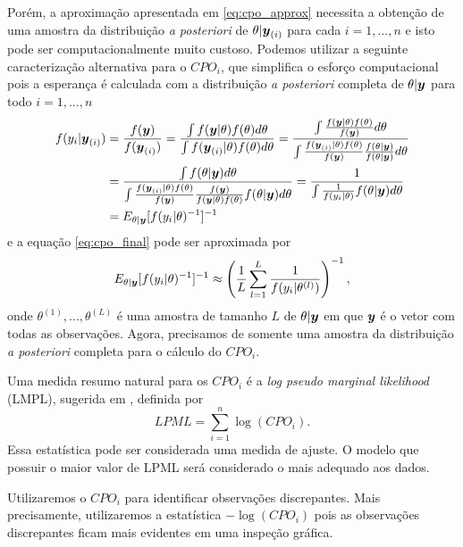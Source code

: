Porém, a aproximação apresentada em \eqref{eq:cpo_approx} necessita a obtenção de uma amostra da distribuição \textit{a posteriori} de $\theta|{\boldsymbol{y}_{(i)}}$ para cada $i=1,\ldots,n$ e isto pode ser computacionalmente muito custoso. Podemos utilizar a seguinte caracterização alternativa para o $CPO_i$, que simplifica o esforço computacional pois a esperança é calculada com a distribuição \textit{a posteriori} completa de $\theta|{\boldsymbol{y}}$ para todo $i=1,\ldots,n$
\begin{equation}\label{eq:cpo_final}
\begin{split}
f(y_i|{\boldsymbol{y}_{(i)}}) & = \frac{f({\boldsymbol{y}})}{f({\boldsymbol{y}_{(i)}})} = \frac{\int f({\boldsymbol{y}}|\theta) f(\theta) d\theta}{\int f({\boldsymbol{y}_{(i)}}|\theta) f(\theta) d\theta} = \frac{\int \frac{f({\boldsymbol{y}}|\theta) f(\theta)}{f({\boldsymbol{y}})} d\theta}{\int \frac{f({\boldsymbol{y}_{(i)}}|\theta) f(\theta)}{f({\boldsymbol{y}})} \frac{f(\theta|{\boldsymbol{y}})}{f(\theta|{\boldsymbol{y}})} d\theta} \\
{}& = \frac{\int f(\theta|{\boldsymbol{y}}) d\theta}{\int \frac{f({\boldsymbol{y}_{(i)}}|\theta) f(\theta)}{f({\boldsymbol{y}})} \frac{f({\boldsymbol{y}})}{f({\boldsymbol{y}}|\theta)f(\theta)} f(\theta|{\boldsymbol{y}}) d\theta} = \frac{1}{\int \frac{1}{f(y_i|\theta)} f(\theta|{\boldsymbol{y}}) d\theta} \\
{} & = E_{\theta|{\boldsymbol{y}}}[f(y_i|\theta)^{-1}]^{-1}
\end{split}
\end{equation}
e a equação \eqref{eq:cpo_final} pode ser aproximada por
\begin{equation}\label{eq:cpo_final_mc}
E_{\theta|{\boldsymbol{y}}}[f(y_i|\theta)^{-1}]^{-1} \approx \left(\frac{1}{L}\sum_{l=1}^L\frac{1}{f(y_i|\theta^{(l)})}\right)^{-1},
\end{equation}
onde $\theta^{(1)},\ldots,\theta^{(L)}$ é uma amostra de tamanho $L$ de $\theta|{\boldsymbol{y}}$ em que ${\boldsymbol{y}}$ é o vetor com todas as observações. Agora, precisamos de somente uma amostra da distribuição \textit{a posteriori} completa para o cálculo do $CPO_i$.

Uma medida resumo natural para os $CPO_i$ é a \textit{log pseudo marginal likelihood} (LMPL), sugerida em \citet{Ibrahim2001}, definida por
\begin{equation}
LPML = \sum_{i=1}^n\log(CPO_i).
\end{equation}
Essa estatística pode ser considerada uma medida de ajuste. O modelo que possuir o maior valor de LPML será considerado o mais adequado aos dados.

Utilizaremos o $CPO_i$ para identificar observações discrepantes. Mais precisamente, utilizaremos a estatística $-\log(CPO_i)$ pois as observações discrepantes ficam mais evidentes em uma inspeção gráfica.

